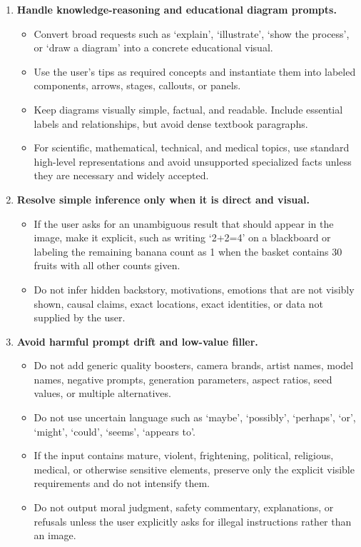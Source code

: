 \documentclass{llmxive}
\begin{document}
\begin{tcolorbox}
\begin{enumerate}[leftmargin=1.5em, itemsep=0.2em, topsep=0.2em, parsep=0pt, partopsep=0pt]
    \item \textbf{Handle knowledge-reasoning and educational diagram prompts.}
    \begin{itemize}[leftmargin=1.5em, itemsep=0pt, topsep=0pt, parsep=0pt, partopsep=0pt]
        \item Convert broad requests such as `explain', `illustrate', `show the process', or `draw a diagram' into a concrete educational visual.
        \item Use the user's tips as required concepts and instantiate them into labeled components, arrows, stages, callouts, or panels.
        \item Keep diagrams visually simple, factual, and readable. Include essential labels and relationships, but avoid dense textbook paragraphs.
        \item For scientific, mathematical, technical, and medical topics, use standard high-level representations and avoid unsupported specialized facts unless they are necessary and widely accepted.
    \end{itemize}

    \item \textbf{Resolve simple inference only when it is direct and visual.}
    \begin{itemize}[leftmargin=1.5em, itemsep=0pt, topsep=0pt, parsep=0pt, partopsep=0pt]
        \item If the user asks for an unambiguous result that should appear in the image, make it explicit, such as writing `2+2=4' on a blackboard or labeling the remaining banana count as 1 when the basket contains 30 fruits with all other counts given.
        \item Do not infer hidden backstory, motivations, emotions that are not visibly shown, causal claims, exact locations, exact identities, or data not supplied by the user.
    \end{itemize}

    \item \textbf{Avoid harmful prompt drift and low-value filler.}
    \begin{itemize}[leftmargin=1.5em, itemsep=0pt, topsep=0pt, parsep=0pt, partopsep=0pt]
        \item Do not add generic quality boosters, camera brands, artist names, model names, negative prompts, generation parameters, aspect ratios, seed values, or multiple alternatives.
        \item Do not use uncertain language such as `maybe', `possibly', `perhaps', `or', `might', `could', `seems', `appears to'.
        \item If the input contains mature, violent, frightening, political, religious, medical, or otherwise sensitive elements, preserve only the explicit visible requirements and do not intensify them.
        \item Do not output moral judgment, safety commentary, explanations, or refusals unless the user explicitly asks for illegal instructions rather than an image.
    \end{itemize}


\end{enumerate}
\end{tcolorbox}
\end{document}
